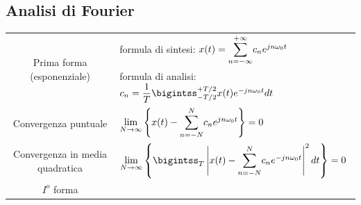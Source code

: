 \documentclass{article}
\begin{document}
\subsection{Analisi di Fourier}
\begin{center}
    \renewcommand{\arraystretch}{3}
    \begin{tabular}{|c|l|}
        \hline 
        \multirow{2}{7em}{Prima forma (esponenziale)} & formula di sintesi: $x(t)=\mathlarger{\sum}_{n=-\infty}^{+\infty} c_n e^{jn \omega_0t}$\\
        & formula di analisi: $c_n = \dfrac{1}{T} \bigintss_{-T/2}^{+T/2} x(t)e^{-jn\omega_0t}dt$\\
        \hline
        Convergenza puntuale & $\lim\limits_{N \rightarrow \infty} \left\{ x(t) - \mathlarger{\sum}_{n=-N}^N c_n e^{jn\omega_0t} \right\}=0$\\
        \hline
        Convergenza in media quadratica & $\lim\limits_{N \rightarrow \infty} \left\{ \bigintss_T \left| x(t) - \mathlarger{\sum}_{n=-N}^N c_n e^{-jn\omega_0t} \right|^2 dt \right\}=0$\\
        \hline
        $I^o$ forma & $$
    \end{tabular}
\end{center}
\end{document}
